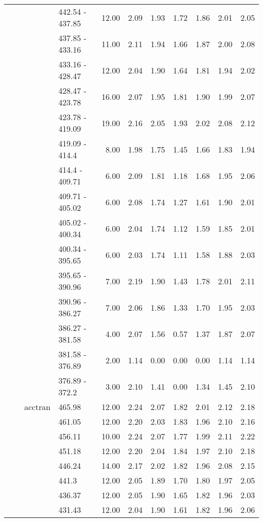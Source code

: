\begin{longtable}{llllrrrrrrr}
   &  &  & 442.54 - 437.85 & 12.00 & 2.09 & 1.93 & 1.72 & 1.86 & 2.01 & 2.05 \\ 
   &  &  & 437.85 - 433.16 & 11.00 & 2.11 & 1.94 & 1.66 & 1.87 & 2.00 & 2.08 \\ 
   &  &  & 433.16 - 428.47 & 12.00 & 2.04 & 1.90 & 1.64 & 1.81 & 1.94 & 2.02 \\ 
   &  &  & 428.47 - 423.78 & 16.00 & 2.07 & 1.95 & 1.81 & 1.90 & 1.99 & 2.07 \\ 
   &  &  & 423.78 - 419.09 & 19.00 & 2.16 & 2.05 & 1.93 & 2.02 & 2.08 & 2.12 \\ 
   &  &  & 419.09 - 414.4 & 8.00 & 1.98 & 1.75 & 1.45 & 1.66 & 1.83 & 1.94 \\ 
   &  &  & 414.4 - 409.71 & 6.00 & 2.09 & 1.81 & 1.18 & 1.68 & 1.95 & 2.06 \\ 
   &  &  & 409.71 - 405.02 & 6.00 & 2.08 & 1.74 & 1.27 & 1.61 & 1.90 & 2.01 \\ 
   &  &  & 405.02 - 400.34 & 6.00 & 2.04 & 1.74 & 1.12 & 1.59 & 1.85 & 2.01 \\ 
   &  &  & 400.34 - 395.65 & 6.00 & 2.03 & 1.74 & 1.11 & 1.58 & 1.88 & 2.03 \\ 
   &  &  & 395.65 - 390.96 & 7.00 & 2.19 & 1.90 & 1.43 & 1.78 & 2.01 & 2.11 \\ 
   &  &  & 390.96 - 386.27 & 7.00 & 2.06 & 1.86 & 1.33 & 1.70 & 1.95 & 2.03 \\ 
   &  &  & 386.27 - 381.58 & 4.00 & 2.07 & 1.56 & 0.57 & 1.37 & 1.87 & 2.07 \\ 
   &  &  & 381.58 - 376.89 & 2.00 & 1.14 & 0.00 & 0.00 & 0.00 & 1.14 & 1.14 \\ 
   &  &  & 376.89 - 372.2 & 3.00 & 2.10 & 1.41 & 0.00 & 1.34 & 1.45 & 2.10 \\ 
   &  & acctran & 465.98 & 12.00 & 2.24 & 2.07 & 1.82 & 2.01 & 2.12 & 2.18 \\ 
   &  &  & 461.05 & 12.00 & 2.20 & 2.03 & 1.83 & 1.96 & 2.10 & 2.16 \\ 
   &  &  & 456.11 & 10.00 & 2.24 & 2.07 & 1.77 & 1.99 & 2.11 & 2.22 \\ 
   &  &  & 451.18 & 12.00 & 2.20 & 2.04 & 1.84 & 1.97 & 2.10 & 2.18 \\ 
   &  &  & 446.24 & 14.00 & 2.17 & 2.02 & 1.82 & 1.96 & 2.08 & 2.15 \\ 
   &  &  & 441.3 & 12.00 & 2.05 & 1.89 & 1.70 & 1.80 & 1.97 & 2.05 \\ 
   &  &  & 436.37 & 12.00 & 2.05 & 1.90 & 1.65 & 1.82 & 1.96 & 2.03 \\ 
   &  &  & 431.43 & 12.00 & 2.04 & 1.90 & 1.61 & 1.82 & 1.96 & 2.06 \\ 

\end{longtable}
